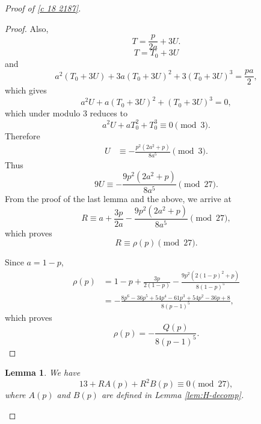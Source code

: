 \documentclass[12pt]{article}
\numberwithin{equation}{section}
\theoremstyle{plain}
\numberwithin{theorem}{section}
\newtheorem{lemma}[theorem]{Lemma}
\theoremstyle{definition}
\theoremstyle{remark}
\begin{document}
\begin{proof}[Proof of \eqref{c 18 2187}]
\begin{proof}
Also,
\begin{equation*}
T=\frac{p}{2a}+3U.
\end{equation*}
\fi
\begin{equation*}
T=T_0+3U
\end{equation*}
and
\begin{equation*}
a^2(T_0+3U)
+
3a(T_0+3U)^2
+
3(T_0+3U)^3
=
\frac{pa}{2},
\end{equation*}
which gives
\begin{equation*}
a^2U
+
a(T_0+3U)^2
+
(T_0+3U)^3
=
0,
\end{equation*}
which under modulo $3$ reduces to
\begin{equation*}
a^2U+aT_0^2+T_0^3
\equiv0\pmod3.
\end{equation*}
Therefore
\begin{align*}
U&\equiv
-\frac{p^2(2a^2+p)}
       {8a^5}
\pmod3.
\end{align*}
Thus
\begin{equation*}
9U
\equiv
-\frac{9p^2(2a^2+p)}
       {8a^5}
\pmod{27}.
\end{equation*}
From the proof of the last lemma and the above, we arrive at
\begin{equation*}
R
\equiv
a+\frac{3p}{2a}
-\frac{9p^2(2a^2+p)}
       {8a^5}
\pmod{27},
\end{equation*}
which proves
\begin{equation*}
R\equiv\rho(p)\pmod{27}.
\end{equation*}

Since $a=1-p$,
\begin{align*}
\rho(p)
&=
1-p
+
\frac{3p}{2(1-p)}
-
\frac{9p^2(2(1-p)^2+p)}
       {8(1-p)^5}
\\
&=
-\frac{
8p^6-36p^5+54p^4-61p^3
+54p^2-36p+8
}
{8(p-1)^5},
\end{align*}
which proves
\begin{equation*}
\rho(p)
=
-\frac{Q(p)}{8(p-1)^5}.
\end{equation*}
\end{proof}


\begin{lemma}\label{lem:main-pk-cong}
We have
\begin{equation*}
13+RA(p)+R^2B(p)\equiv0\pmod{27},
\end{equation*}where $A(p)$ and $B(p)$ are defined in Lemma \ref{lem:H-decomp}.
\end{lemma}


\end{proof}
\end{document}
